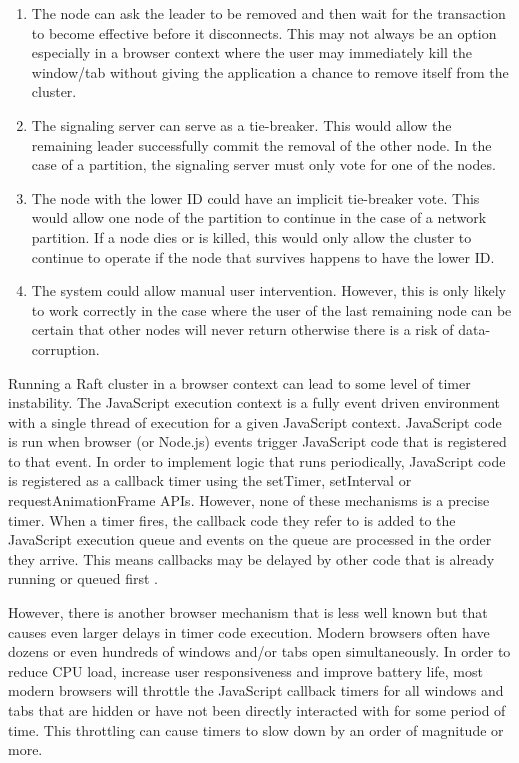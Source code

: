 \documentclass[9pt]{extarticle}
\begin{document}
\begin{multicols}{2}
\begin{enumerate}
\item The node can ask the leader to be removed and then wait for the
  transaction to become effective before it disconnects.  This may not
  always be an option especially in a browser context where the user
  may immediately kill the window/tab without giving the application
  a chance to remove itself from the cluster.
\item The signaling server can serve as a tie-breaker. This would allow
  the remaining leader successfully commit the removal of the other
  node. In the case of a partition, the signaling server must only
  vote for one of the nodes.
\item The node with the lower ID could have an implicit tie-breaker vote.
  This would allow one node of the partition to continue in the case
  of a network partition. If a node dies or is killed, this would only
  allow the cluster to continue to operate if the node that survives
  happens to have the lower ID.
\item The system could allow manual user intervention. However, this is
  only likely to work correctly in the case where the user of the last
  remaining node can be certain that other nodes will never return
  otherwise there is a risk of data-corruption.
\end{enumerate}

Running a Raft cluster in a browser context can lead to some level of
timer instability. The JavaScript execution context is a fully event
driven environment with a single thread of execution for a given
JavaScript context. JavaScript code is run when browser (or Node.js)
events trigger JavaScript code that is registered to that event. In
order to implement logic that runs periodically, JavaScript code is
registered as a callback timer using the setTimer, setInterval or
requestAnimationFrame APIs. However, none of these mechanisms is
a precise timer. When a timer fires, the callback code they refer to
is added to the JavaScript execution queue and events on the queue are
processed in the order they arrive. This means callbacks may be
delayed by other code that is already running or queued first
\cite{resig2013secrets}.

However, there is another browser mechanism that is less well known
but that causes even larger delays in timer code execution. Modern
browsers often have dozens or even hundreds of windows and/or tabs
open simultaneously. In order to reduce CPU load, increase user
responsiveness and improve battery life, most modern browsers will
throttle the JavaScript callback timers for all windows and tabs that
are hidden or have not been directly interacted with for some period
of time. This throttling can cause timers to slow down by an order of
magnitude or more. %


\end{multicols}
\end{document}
